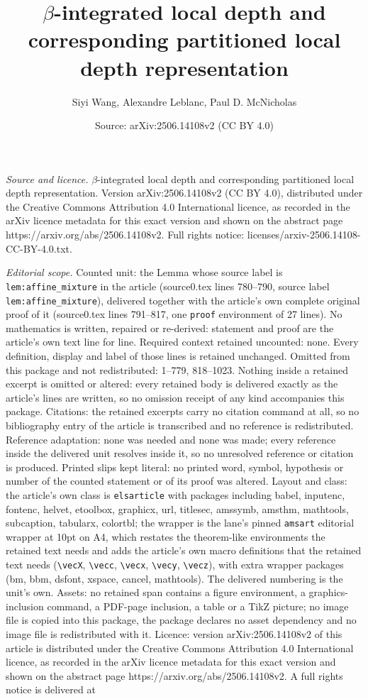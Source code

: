 \documentclass[10pt,a4paper]{amsart}
\title[$\beta$-integrated local depth and corresponding partitioned]{$\beta$-integrated local depth and corresponding partitioned local depth representation}
\author{Siyi Wang, Alexandre Leblanc, Paul D. McNicholas}
\date{Source: arXiv:2506.14108v2 (CC BY 4.0)}
\begin{document}
\maketitle

\noindent\emph{Source and licence.} $\beta$-integrated local depth and corresponding partitioned local depth representation. Version arXiv:2506.14108v2 (CC BY 4.0), distributed under the Creative Commons Attribution 4.0 International licence, as recorded in the arXiv licence metadata for this exact version and shown on the abstract page https://arxiv.org/abs/2506.14108v2. Full rights notice: licenses/arxiv-2506.14108-CC-BY-4.0.txt.\par\smallskip

\noindent\textit{Editorial scope.} Counted unit: the Lemma whose source label is \texttt{lem:affine\_mixture} in the article (source0.tex lines 780--790, source label \texttt{lem:affine\_mixture}), delivered together with the article's own complete original proof of it (source0.tex lines 791--817, one \texttt{proof} environment of 27 lines). No mathematics is written, repaired or re-derived: statement and proof are the article's own text line for line. Required context retained uncounted: none. Every definition, display and label of those lines is retained unchanged. Omitted from this package and not redistributed: 1--779, 818--1023. Nothing inside a retained excerpt is omitted or altered: every retained body is delivered exactly as the article's lines are written, so no omission receipt of any kind accompanies this package. Citations: the retained excerpts carry no citation command at all, so no bibliography entry of the article is transcribed and no reference is redistributed. Reference adaptation: none was needed and none was made; every reference inside the delivered unit resolves inside it, so no unresolved reference or citation is produced. Printed slips kept literal: no printed word, symbol, hypothesis or number of the counted statement or of its proof was altered. Layout and class: the article's own class is \texttt{elsarticle} with packages including babel, inputenc, fontenc, helvet, etoolbox, graphicx, url, titlesec, amssymb, amsthm, mathtools, subcaption, tabularx, colortbl; the wrapper is the lane's pinned \texttt{amsart} editorial wrapper at 10pt on A4, which restates the theorem-like environments the retained text needs and adds the article's own macro definitions that the retained text needs (\texttt{\textbackslash vecX}, \texttt{\textbackslash vecc}, \texttt{\textbackslash vecx}, \texttt{\textbackslash vecy}, \texttt{\textbackslash vecz}), with extra wrapper packages (bm, bbm, dsfont, xspace, cancel, mathtools). The delivered numbering is the unit's own. Assets: no retained span contains a figure environment, a graphics-inclusion command, a PDF-page inclusion, a table or a TikZ picture; no image file is copied into this package, the package declares no asset dependency and no image file is redistributed with it. Licence: version arXiv:2506.14108v2 of this article is distributed under the Creative Commons Attribution 4.0 International licence, as recorded in the arXiv licence metadata for this exact version and shown on the abstract page https://arxiv.org/abs/2506.14108v2. A full rights notice is delivered at 
\end{document}
